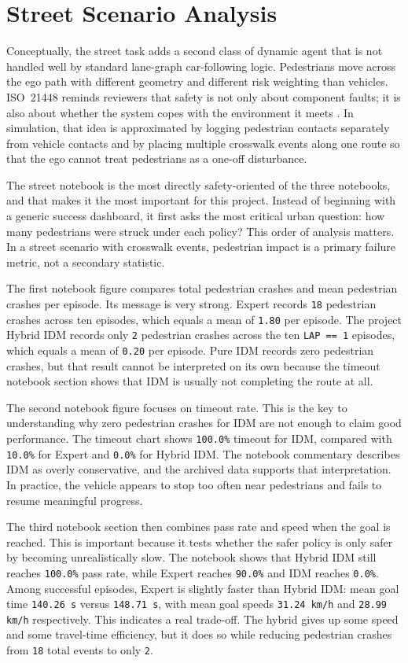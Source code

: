 \documentclass[12pt,a4paper]{report}
\begin{document}
\section{Street Scenario Analysis}
Conceptually, the street task adds a second class of dynamic agent that is not handled well by standard lane-graph car-following logic. Pedestrians move across the ego path with different geometry and different risk weighting than vehicles. ISO~21448 reminds reviewers that safety is not only about component faults; it is also about whether the system copes with the environment it meets \cite{iso21448}. In simulation, that idea is approximated by logging pedestrian contacts separately from vehicle contacts and by placing multiple crosswalk events along one route so that the ego cannot treat pedestrians as a one-off disturbance.

The street notebook is the most directly safety-oriented of the three notebooks, and that makes it the most important for this project. Instead of beginning with a generic success dashboard, it first asks the most critical urban question: how many pedestrians were struck under each policy? This order of analysis matters. In a street scenario with crosswalk events, pedestrian impact is a primary failure metric, not a secondary statistic.

The first notebook figure compares total pedestrian crashes and mean pedestrian crashes per episode. Its message is very strong. Expert records \texttt{18} pedestrian crashes across ten episodes, which equals a mean of \texttt{1.80} per episode. The project Hybrid IDM records only \texttt{2} pedestrian crashes across the ten \texttt{LAP == 1} episodes, which equals a mean of \texttt{0.20} per episode. Pure IDM records zero pedestrian crashes, but that result cannot be interpreted on its own because the timeout notebook section shows that IDM is usually not completing the route at all.

The second notebook figure focuses on timeout rate. This is the key to understanding why zero pedestrian crashes for IDM are not enough to claim good performance. The timeout chart shows \texttt{100.0\%} timeout for IDM, compared with \texttt{10.0\%} for Expert and \texttt{0.0\%} for Hybrid IDM. The notebook commentary describes IDM as overly conservative, and the archived data supports that interpretation. In practice, the vehicle appears to stop too often near pedestrians and fails to resume meaningful progress.

The third notebook section then combines pass rate and speed when the goal is reached. This is important because it tests whether the safer policy is only safer by becoming unrealistically slow. The notebook shows that Hybrid IDM still reaches \texttt{100.0\%} pass rate, while Expert reaches \texttt{90.0\%} and IDM reaches \texttt{0.0\%}. Among successful episodes, Expert is slightly faster than Hybrid IDM: mean goal time \texttt{140.26 s} versus \texttt{148.71 s}, with mean goal speeds \texttt{31.24 km/h} and \texttt{28.99 km/h} respectively. This indicates a real trade-off. The hybrid gives up some speed and some travel-time efficiency, but it does so while reducing pedestrian crashes from \texttt{18} total events to only \texttt{2}.
\end{document}

